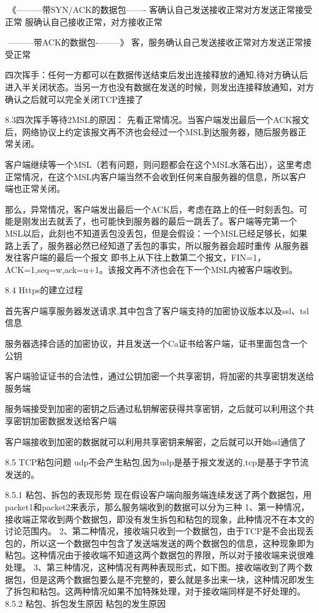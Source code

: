 \documentclass[UTF8]{ctexart}
\begin{document}
​ 《---------带SYN/ACK的数据包------- 客确认自己发送接收正常对方发送正常接受正常 服确认自己接收正常，对方接收正常

​ —------带ACK的数据包-—-----》 客，服务确认自己发送接收正常对方发送正常接受正常

四次挥手：任何一方都可以在数据传送结束后发出连接释放的通知,待对方确认后进入半关闭状态。当另一方也没有数据在发送的时候，则发出连接释放通知，对方确认之后就可以完全关闭TCP连接了

8.3四次挥手等待2MSL的原因：
先看正常情况。当客户端发出最后一个ACK报文后，网络协议上约定该报文再不济也会经过一个MSL到达服务器，随后服务器正常关闭。

客户端继续等一个MSL（若有问题，则问题都会在这个MSL水落石出），这里考虑正常情况，在这个MSL内客户端当然不会收到任何来自服务器的信息，所以客户端也正常关闭。

那么，异常情况，客户端发出最后一个ACK后，考虑在路上的任一时刻丢包。可能是刚发出去就丢了，也可能快到服务器的最后一跳丢了。客户端等完第一个MSL以后，此刻也不知道丢包没丢包，但是会假设：一个MSL已经足够长，如果路上丢了，服务器必然已经知道了丢包的事实，所以服务器会超时重传 从服务器发往客户端的最后一个报文 即书上从下往上数第二个报文，FIN=1，ACK=1,seq=w,ack=u+1。该报文再不济也会在下一个MSL内被客户端收到。

8.4 Https的建立过程


首先客户端享服务器发送请求,其中包含了客户端支持的加密协议版本以及ssl、tsl信息

服务器选择合适的加密协议，并且发送一个Ca证书给客户端，证书里面包含一个公钥

客户端验证证书的合法性，通过公钥加密一个共享密钥，将加密的共享密钥发送给服务端

服务端接受到加密的密钥之后通过私钥解密获得共享密钥，之后就可以利用这个共享密钥加密数据发送给客户端

客户端接收到加密的数据就可以利用共享密钥来解密，之后就可以开始ssl通信了

8.5 TCP粘包问题
udp不会产生粘包,因为udp是基于报文发送的,tcp是基于字节流发送的。

8.5.1 粘包、拆包的表现形势
现在假设客户端向服务端连续发送了两个数据包，用packet1和packet2来表示，那么服务端收到的数据可以分为三种
1、第一种情况，接收端正常收到两个数据包，即没有发生拆包和粘包的现象，此种情况不在本文的讨论范围内。
2、第二种情况，接收端只收到一个数据包，由于TCP是不会出现丢包的，所以这一个数据包中包含了发送端发送的两个数据包的信息，这种现象即为粘包。这种情况由于接收端不知道这两个数据包的界限，所以对于接收端来说很难处理。
3、第三种情况，这种情况有两种表现形式，如下图。接收端收到了两个数据包，但是这两个数据包要么是不完整的，要么就是多出来一块，这种情况即发生了拆包和粘包。这两种情况如果不加特殊处理，对于接收端同样是不好处理的。
8.5.2 粘包、拆包发生原因
粘包的发生原因
\end{document}
